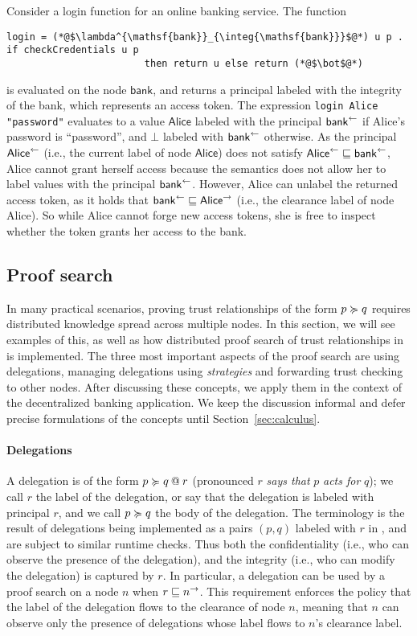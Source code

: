 Consider a login function for an online banking service. The function
\begin{lstlisting}
login = (*@$\lambda^{\mathsf{bank}}_{\integ{\mathsf{bank}}}$@*) u p . if checkCredentials u p
                        then return u else return (*@$\bot$@*)
\end{lstlisting}
is evaluated on the node $\mathsf{bank}$, and returns a principal labeled with the integrity of the bank, which represents an access token. The expression \lstinline[mathescape]!login Alice "password"! evaluates to a value $\mathsf{Alice}$ labeled with the principal $\integ{\mathsf{bank}}$ if Alice's password is ``password'', and $\bot$ labeled with $\integ{\mathsf{bank}}$ otherwise. As the principal $\integ{\mathsf{Alice}}$ (i.e., the current label of node $\mathsf{Alice}$) does not satisfy $\integ{\mathsf{Alice}} \flowsto \integ{\mathsf{bank}}$, Alice cannot grant herself access because the semantics does not allow her to label values with the principal $\integ{\mathsf{bank}}$.
However, Alice can unlabel the returned access token, as it holds that $\integ{\mathsf{bank}} \flowsto \conf{\mathsf{Alice}}$ (i.e., the clearance label of node Alice). So while Alice cannot forge new access tokens, she is free to inspect whether the token grants her access to the bank.

\subsection{Proof search}
In many practical scenarios, proving trust relationships of the form $p \actsfor q$ requires distributed knowledge spread across multiple nodes. In this section, we will see examples of this, as well as how distributed proof search of trust relationships in \lang{} is implemented. The three most important aspects of the proof search are using delegations, managing delegations using \emph{strategies} and forwarding trust checking to other nodes. After discussing these concepts, we apply them in the context of the decentralized banking application. We keep the discussion informal and defer precise formulations of the concepts until Section~\ref{sec:calculus}.

\paragraph{Delegations}
A delegation is of the form $\lb{r}{p \actsfor q}$ (pronounced $r$ \emph{says that} $p$ \emph{acts for} $q$); we call $r$ the label of the delegation, or say that the delegation is labeled with principal $r$, and we call $p \actsfor q$ the body of the delegation. The terminology is the result of delegations being implemented as a pairs $(p, q)$ labeled with $r$ in \lang, and are subject to similar runtime checks. Thus both the confidentiality (i.e., who can observe the presence of the delegation), and the integrity (i.e., who can modify the delegation) is captured by $r$. In particular, a delegation can be used by a proof search on a node $n$ when $r \flowsto \conf{n}$. This requirement enforces the policy that the label of the delegation flows to the clearance of node $n$, meaning that $n$ can observe only the presence of delegations whose label flows to $n$'s clearance label.

